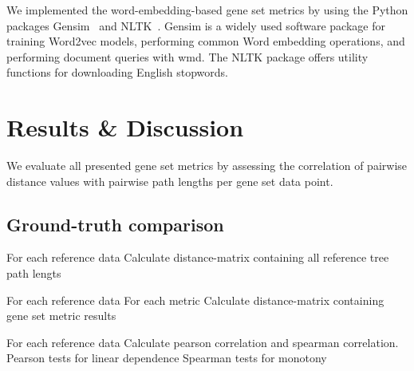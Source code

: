 \documentclass{thesisclass}
\begin{document}
We implemented the word-embedding-based gene set metrics by using the Python packages Gensim~\cite{rehurek_lrec} and NLTK~\cite{Loper:2002:NNL:1118108.1118117}. Gensim is a widely used software package for training Word2vec models, performing common Word embedding operations, and performing document queries with \acrshort{wmd}. The NLTK package offers utility functions for downloading English stopwords.


\chapter{Results \& Discussion}
\label{ch:results}

We evaluate all presented gene set metrics by assessing the correlation of pairwise distance values with pairwise path lengths per gene set data point.


\section{Ground-truth comparison}

For each reference data
Calculate distance-matrix containing all reference tree path lengts


For each reference data
For each metric
Calculate distance-matrix containing gene set metric results

For each reference data
Calculate pearson correlation and spearman correlation.
Pearson tests for linear dependence
Spearman tests for monotony 
\end{document}
